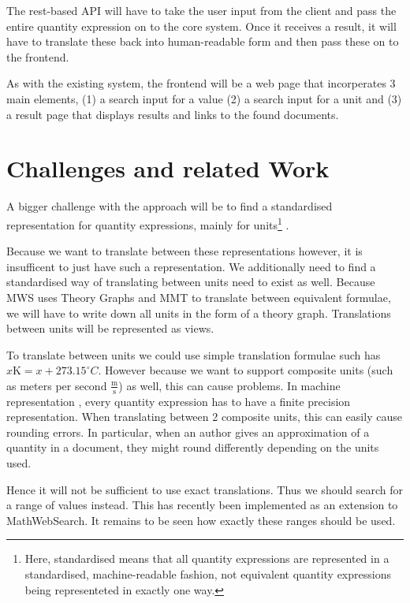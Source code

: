 \documentclass[11pt]{article}
\begin{document}
The rest-based API will have to take the user input from the client and pass the entire quantity expression on to the core system. Once it receives a result, it will have to translate these back into human-readable form and then pass these on to the frontend.

As with the existing system, the frontend will be a web page that incorperates 3 main elements, (1) a search input for a value (2) a search input for a unit and (3) a result page that displays results and links to the found documents.

\section{Challenges and related Work}
\label{sec:problems_relatedwork}

A bigger challenge with the approach will be to find a standardised representation for quantity expressions, mainly for units\footnote{Here, standardised means that all quantity expressions are represented in a standardised, machine-readable fashion, not equivalent quantity expressions being representeted in exactly one way. } .

Because we want to translate between these representations however, it is insufficent to just have such a representation. We additionally need to find a standardised way of translating between units need to exist as well. Because MWS uses Theory Graphs and MMT to translate between equivalent formulae, we will have to write down all units in the form of a theory graph. Translations between units will be represented as views.

To translate between units we could use simple translation formulae such has $x \text{K} = x + 273.15 ^\circ{C} $. However because we want to support composite units (such as meters per second $\frac{\text{m}}{\text{s}}$) as well, this can cause problems. In machine representation , every quantity expression has to have a finite precision representation. When translating between 2 composite units, this can easily cause rounding errors. In particular, when an author gives an approximation of a quantity in a document, they might round differently depending on the units used.

Hence it will not be sufficient to use exact translations. Thus we should search for a range of values instead. This has recently been implemented as an extension to MathWebSearch\cite{MWS:Ranges}. It remains to be seen how exactly these ranges should be used.
\end{document}
